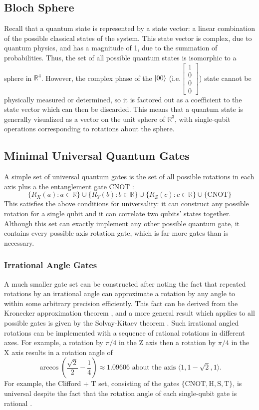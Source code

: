 \documentclass[12pt]{article}
\begin{document}
\subsection{Bloch Sphere}
Recall that a quantum state is represented by a state vector: a linear combination of the possible classical states of the system. This state vector is complex, due to quantum physics, and has a magnitude of 1, due to the summation of probabilities. Thus, the set of all possible quantum states is isomorphic to a sphere in $\mathbb{R}^4$. However, the complex phase of the  $\ket{00}$ (i.e.$\left[\begin{smallmatrix} 1 \\ 0 \\ 0 \\ 0 \end{smallmatrix}\right]$) state cannot be physically measured or determined, so it is factored out as a coefficient to the state vector which can then be discarded. This means that a quantum state is generally visualized as a vector on the unit sphere of $\mathbb{R}^3$, with single-qubit operations corresponding to rotations about the sphere.

\subsection{Minimal Universal Quantum Gates}
A simple set of universal quantum gates is the set of all possible rotations in each axis plus a the entanglement gate CNOT \cite{Boykin2000}:
$$\{R_X(a) : a \in \mathbb{R}\} \cup \{R_Y(b) : b \in \mathbb{R}\} \cup \{R_Z(c) : c \in \mathbb{R}\} \cup \{\text{CNOT}\}$$
This satisfies the above conditions for universality: it can construct any possible rotation for a single qubit and it can correlate two qubits' states together. Although this set can exactly implement any other possible quantum gate, it contains every possible axis rotation gate, which is far more gates than is necessary.

\subsubsection{Irrational Angle Gates}
A much smaller gate set can be constructed after noting the fact that repeated rotations by an irrational angle can approximate a rotation by any angle to within some arbitrary precision efficiently. This fact can be derived from the Kronecker approximation theorem \cite{Hlawka1986}, and a more general result which applies to all possible gates is given by the Solvay-Kitaev theorem \cite{Dawson2005solovaykitaevalgorithm}.
Such irrational angled rotations can be implemented with a sequence of rational rotations in different axes. For example, a rotation by $\pi/4$ in the Z axis then a rotation by $\pi / 4$ in the X axis results in a rotation angle of
$$\arccos\left(\frac{\sqrt{2}}{2} - \frac{1}{4}\right) \approx 1.09606 \text{ about the axis } \langle 1, 1 - \sqrt{2}, 1 \rangle \text{.}$$
For example, the Clifford + T set, consisting of the gates $\{\text{CNOT}, \text{H}, \text{S}, \text{T}\}$, is universal despite the fact that the rotation angle of each single-qubit gate is rational \cite{Boykin2000}.
\end{document}
